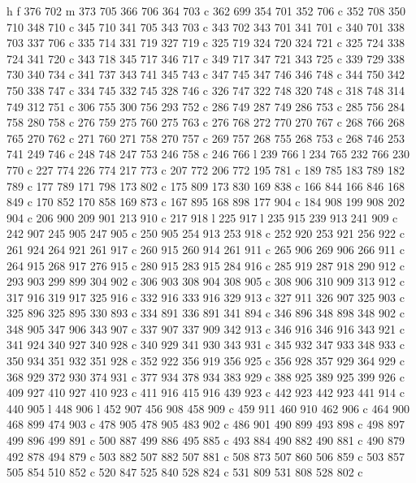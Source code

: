 {{   h f
   376 702 m
   373 705 366 706 364 703 c
   362 699 354 701 352 706 c
   352 708 350 710 348 710 c
   345 710 341 705 343 703 c
   343 702 343 701 341 701 c
   340 701 338 703 337 706 c
   335 714 331 719 327 719 c
   325 719 324 720 324 721 c
   325 724 338 724 341 720 c
   343 718 345 717 346 717 c
   349 717 347 721 343 725 c
   339 729 338 730 340 734 c
   341 737 343 741 345 743 c
   347 745 347 746 346 748 c
   344 750 342 750 338 747 c
   334 745 332 745 328 746 c
   326 747 322 748 320 748 c
   318 748 314 749 312 751 c
   306 755 300 756 293 752 c
   286 749 287 749 286 753 c
   285 756 284 758 280 758 c
   276 759 275 760 275 763 c
   276 768 272 770 270 767 c
   268 766 268 765 270 762 c
   271 760 271 758 270 757 c
   269 757 268 755 268 753 c
   268 746 253 741 249 746 c
   248 748 247 753 246 758 c
   246 766 l
   239 766 l
   234 765 232 766 230 770 c
   227 774 226 774 217 773 c
   207 772 206 772 195 781 c
   189 785 183 789 182 789 c
   177 789 171 798 173 802 c
   175 809 173 830 169 838 c
   166 844 166 846 168 849 c
   170 852 170 858 169 873 c
   167 895 168 898 177 904 c
   184 908 199 908 202 904 c
   206 900 209 901 213 910 c
   217 918 l
   225 917 l
   235 915 239 913 241 909 c
   242 907 245 905 247 905 c
   250 905 254 913 253 918 c
   252 920 253 921 256 922 c
   261 924 264 921 261 917 c
   260 915 260 914 261 911 c
   265 906 269 906 266 911 c
   264 915 268 917 276 915 c
   280 915 283 915 284 916 c
   285 919 287 918 290 912 c
   293 903 299 899 304 902 c
   306 903 308 904 308 905 c
   308 906 310 909 313 912 c
   317 916 319 917 325 916 c
   332 916 333 916 329 913 c
   327 911 326 907 325 903 c
   325 896 325 895 330 893 c
   334 891 336 891 341 894 c
   346 896 348 898 348 902 c
   348 905 347 906 343 907 c
   337 907 337 909 342 913 c
   346 916 346 916 343 921 c
   341 924 340 927 340 928 c
   340 929 341 930 343 931 c
   345 932 347 933 348 933 c
   350 934 351 932 351 928 c
   352 922 356 919 356 925 c
   356 928 357 929 364 929 c
   368 929 372 930 374 931 c
   377 934 378 934 383 929 c
   388 925 389 925 399 926 c
   409 927 410 927 410 923 c
   411 916 415 916 439 923 c
   442 923 442 923 441 914 c
   440 905 l
   448 906 l
   452 907 456 908 458 909 c
   459 911 460 910 462 906 c
   464 900 468 899 474 903 c
   478 905 478 905 483 902 c
   486 901 490 899 493 898 c
   498 897 499 896 499 891 c
   500 887 499 886 495 885 c
   493 884 490 882 490 881 c
   490 879 492 878 494 879 c
   503 882 507 882 507 881 c
   508 873 507 860 506 859 c
   503 857 505 854 510 852 c
   520 847 525 840 528 824 c
   531 809 531 808 528 802 c
}}
